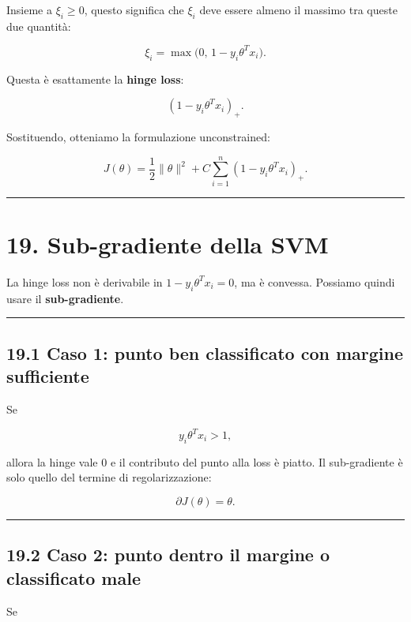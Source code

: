 \documentclass{article}
\begin{document}
Insieme a \(\xi_i\ge 0\), questo significa che \(\xi_i\) deve essere
almeno il massimo tra queste due quantità:

\[
\xi_i = \max\big(0,\,1-y_i\theta^Tx_i\big).
\]

Questa è esattamente la \textbf{hinge loss}:

\[
(1-y_i\theta^Tx_i)_+.
\]

Sostituendo, otteniamo la formulazione unconstrained:

\[
J(\theta)=\frac{1}{2}\|\theta\|^2 + C\sum_{i=1}^n (1-y_i\theta^Tx_i)_+.
\]

\begin{center}\rule{0.5\linewidth}{0.5pt}\end{center}

\section{19. Sub-gradiente della SVM}\label{sub-gradiente-della-svm}

La hinge loss non è derivabile in \(1-y_i\theta^Tx_i=0\), ma è convessa.
Possiamo quindi usare il \textbf{sub-gradiente}.

\begin{center}\rule{0.5\linewidth}{0.5pt}\end{center}

\subsection{19.1 Caso 1: punto ben classificato con margine
sufficiente}\label{caso-1-punto-ben-classificato-con-margine-sufficiente}

Se

\[
y_i\theta^Tx_i > 1,
\]

allora la hinge vale \(0\) e il contributo del punto alla loss è piatto.
Il sub-gradiente è solo quello del termine di regolarizzazione:

\[
\partial J(\theta)=\theta.
\]

\begin{center}\rule{0.5\linewidth}{0.5pt}\end{center}

\subsection{19.2 Caso 2: punto dentro il margine o classificato
male}\label{caso-2-punto-dentro-il-margine-o-classificato-male}

Se
\end{document}
